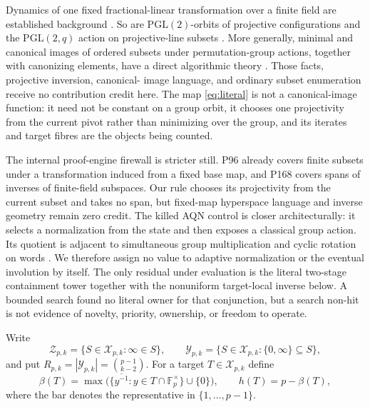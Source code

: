 \documentclass[a4paper,10pt]{amsart}
\theoremstyle{remark}
\newcommand{\F}{\mathbb F}
\newcommand{\X}{\mathcal X}
\newcommand{\Y}{\mathcal Y}
\newcommand{\Z}{\mathcal Z}
\begin{document}
Dynamics of one fixed fractional-linear transformation over a finite field
are established background \citep{ElAbdalaouiShparlinski2019}.  So are
$\mathrm{PGL}(2)$-orbits of projective configurations and the
$\mathrm{PGL}(2,q)$ action on projective-line subsets
\citep{AluffiFaber1993,Tricot2025}.  More generally, minimal and canonical
images of ordered subsets under permutation-group actions, together with
canonizing elements, have a direct algorithmic theory
\citep{JeffersonEtAl2019}.  Those facts, projective inversion, canonical-
image language, and ordinary subset enumeration receive no contribution
credit here.  The map \eqref{eq:literal} is not a canonical-image function:
it need not be constant on a group orbit, it chooses one projectivity from
the current pivot rather than minimizing over the group, and its iterates and
target fibres are the objects being counted.

The internal proof-engine firewall is stricter still.  P96 already covers
finite subsets under a transformation induced from a fixed base map, and
P168 covers spans of inverses of finite-field subspaces.  Our rule chooses
its projectivity from the current subset and takes no span, but fixed-map
hyperspace language and inverse geometry remain zero credit.  The killed AQN
control is closer architecturally: it selects a normalization from the state
and then exposes a classical group action.  Its quotient is adjacent to
simultaneous group multiplication and cyclic rotation on words
\citep{GrinbergMao2024}.  We therefore assign no value to adaptive
normalization or the eventual involution by itself.  The only residual under
evaluation is the literal two-stage containment tower together with the
nonuniform target-local inverse below.  A bounded search found no literal
owner for that conjunction, but a search non-hit is not evidence of novelty,
priority, ownership, or freedom to operate.

Write
\[
 \Z_{p,k}=\{S\in\X_{p,k}:\infty\in S\},\qquad
 \Y_{p,k}=\{S\in\X_{p,k}:\{0,\infty\}\subseteq S\},
\]
and put $R_{p,k}=|\Y_{p,k}|=\binom{p-1}{k-2}$.  For a target
$T\in\X_{p,k}$ define
\begin{equation}\label{eq:height}
 \beta(T)=\max\bigl(\{\overline{y^{-1}}:
      y\in T\cap\F_p^\times\}\cup\{0\}\bigr),
 \qquad h(T)=p-\beta(T),
\end{equation}
where the bar denotes the representative in $\{1,\ldots,p-1\}$.
\end{document}
